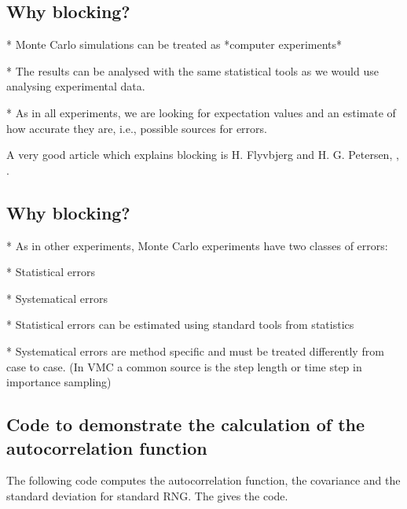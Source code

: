 \documentclass[letterpaper,10pt,english]{sphinxmanual}
\begin{document}
\subsection{Why blocking?}
\label{\detokenize{chapter2:why-blocking}}

\begin{sphinxVerbatim}[commandchars=\\\{\}]
* Monte Carlo simulations can be treated as *computer experiments*

* The results can be analysed with the same statistical tools as we would use analysing experimental data.

* As in all experiments, we are looking for expectation values and an estimate of how accurate they are, i.e., possible sources for errors.
\end{sphinxVerbatim}

A very good article which explains blocking is H. Flyvbjerg and H. G. Petersen, ,  .


\subsection{Why blocking?}
\label{\detokenize{chapter2:id16}}

\begin{sphinxVerbatim}[commandchars=\\\{\}]
* As in other experiments, Monte Carlo experiments have two classes of errors:

  * Statistical errors

  * Systematical errors


* Statistical errors can be estimated using standard tools from statistics

* Systematical errors are method specific and must be treated differently from case to case. (In VMC a common source is the step length or time step in importance sampling)
\end{sphinxVerbatim}


\subsection{Code to demonstrate the calculation of the autocorrelation function}
\label{\detokenize{chapter2:code-to-demonstrate-the-calculation-of-the-autocorrelation-function}}
The following code computes the autocorrelation function, the covariance and the standard deviation
for standard RNG.
The  gives the code.
\end{document}
